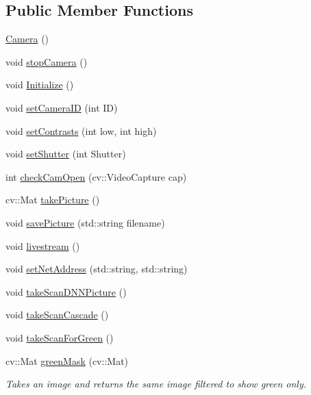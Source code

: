 \subsection*{Public Member Functions}
\begin{DoxyCompactItemize}
\item 
\hyperlink{classCamera_a01f94c3543f56ede7af49dc778f19331}{Camera} ()
\item 
void \hyperlink{classCamera_aac0e2e17954d17a0c15019ca74149f15}{stop\+Camera} ()
\item 
void \hyperlink{classCamera_afd88c2780203f02c9fe236a7239e414c}{Initialize} ()
\item 
void \hyperlink{classCamera_af699a1dad54f8631e862b6f7703e48d3}{set\+Camera\+ID} (int ID)
\item 
void \hyperlink{classCamera_aef0a4ebb556d5a2a0f13e5d120c05259}{set\+Contrasts} (int low, int high)
\item 
void \hyperlink{classCamera_a9409482c4422823f73d45b3d5e29304b}{set\+Shutter} (int Shutter)
\item 
int \hyperlink{classCamera_a230bee20d42ae409aba0700d8205bbe0}{check\+Cam\+Open} (cv\+::\+Video\+Capture cap)
\item 
cv\+::\+Mat \hyperlink{classCamera_a07670e99337fb322375a412222c06ada}{take\+Picture} ()
\item 
void \hyperlink{classCamera_ad0c5cc34e0b16ab7925d2c432ece20de}{save\+Picture} (std\+::string filename)
\item 
void \hyperlink{classCamera_af0d3c970e947813e71f316b9e499b456}{livestream} ()
\item 
void \hyperlink{classCamera_a3595618ceff1b74e79633b4132ada11f}{set\+Net\+Address} (std\+::string, std\+::string)
\item 
void \hyperlink{classCamera_a59f08842d3de300419c74b12bee44d47}{take\+Scan\+D\+N\+N\+Picture} ()
\item 
void \hyperlink{classCamera_a09931f84cc8e66e4e4c1181cb1cb4af6}{take\+Scan\+Cascade} ()
\item 
void \hyperlink{classCamera_ab4f4c3f77479c8594dfa7fd7e6348306}{take\+Scan\+For\+Green} ()
\item 
cv\+::\+Mat \hyperlink{classCamera_adf305e574ca94bce9435c217fef1501b}{green\+Mask} (cv\+::\+Mat)
\begin{DoxyCompactList}\small\item\em Takes an image and returns the same image filtered to show green only. \end{DoxyCompactList}\item 

\end{DoxyCompactItemize}
